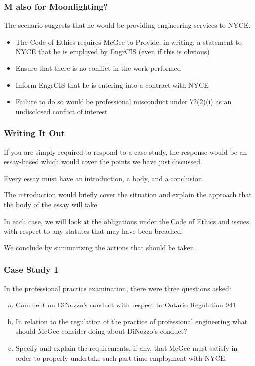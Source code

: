 \begin{frame}
\frametitle{M also for Moonlighting?}

The scenario suggests that he would be providing engineering services to NYCE.

\begin{itemize}
\item The Code of Ethics requires McGee to
Provide, in writing, a statement to NYCE that he is
employed by EngrCIS (even if this is obvious)
\item Ensure that there is no conflict in the work 
performed
\item Inform EngrCIS that he is entering into a contract
with NYCE
\item Failure to do so would be professional
misconduct under 72(2)(i) as an
undisclosed conflict of interest
\end{itemize}

\end{frame}




\begin{frame}
\frametitle{Writing It Out}

If you are simply required to respond to a case study, the response would be an essay-based which would cover the points we have just discussed.

Every essay must have an introduction, a body, and a conclusion.

The introduction would briefly cover the situation and explain the approach that the body of the essay will take.

In each case, we will look at the obligations under the Code of Ethics and issues with respect to any statutes that may have been breached.

We conclude by summarizing the actions that should be taken.

\end{frame}



\begin{frame}
\frametitle{Case Study 1}

In the professional practice examination, there were three questions asked:

\begin{enumerate}[(a)]
\item Comment on DiNozzo's conduct with respect to Ontario Regulation 941.
\item In relation to the regulation of the practice of professional engineering what should McGee consider doing about DiNozzo's conduct?
\item Specify and explain the requirements, if any, that McGee must satisfy in order to properly undertake such part-time employment with NYCE.
\end{enumerate}

\end{frame}



